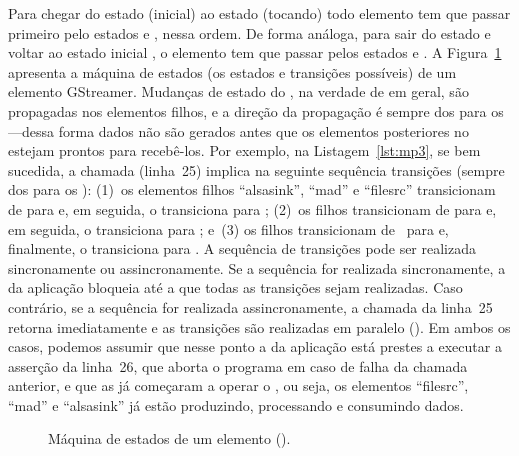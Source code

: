 \documentclass{SBCbookchapter}
\begin{document}
Para chegar do estado  (inicial) ao estado  (tocando)
todo elemento tem que passar primeiro pelo estados  e ,
nessa ordem.  De forma análoga, para sair do estado  e voltar ao
estado inicial , o elemento tem que passar pelos estados
 e .  A Figura~\ref{fig:estados-elt} apresenta a
máquina de estados (os estados e transições possíveis) de um elemento
GStreamer.  Mudanças de estado do , na verdade de  em
geral, são propagadas nos elementos filhos, e a direção da propagação é
sempre dos  para os ---dessa forma dados não são
gerados antes que os elementos posteriores no  estejam prontos
para recebê-los.  Por exemplo, na Listagem~\ref{lst:mp3}, se bem sucedida, a
chamada  (linha~25) implica na seguinte sequência
transições (sempre dos  para os ): (1)~os elementos
filhos ``alsasink'', ``mad'' e ``filesrc'' transicionam de  para
 e, em seguida, o  transiciona para ;
(2)~os filhos transicionam de  para  e, em seguida, o
 transiciona para ; e~(3) os filhos transicionam
de~ para  e, finalmente, o  transiciona
para .  A sequência de transições pode ser realizada
sincronamente ou assincronamente.  Se a sequência for realizada sincronamente,
a  da aplicação bloqueia até a que todas as transições sejam
realizadas.  Caso contrário, se a sequência for realizada assincronamente, a
chamada da linha~25 retorna imediatamente e as transições são realizadas em
paralelo ().  Em ambos os casos, podemos assumir que nesse
ponto a  da aplicação está prestes a executar a asserção da
linha~26, que aborta o programa em caso de falha da chamada anterior, e que
as  já começaram a operar o , ou seja, os
elementos ``filesrc'', ``mad'' e ``alsasink'' já estão produzindo,
processando e consumindo dados.

\begin{figure}[h]
  \centering
  \caption{Máquina de estados de um elemento ().}
  \label{fig:estados-elt}
\end{figure}
\end{document}
